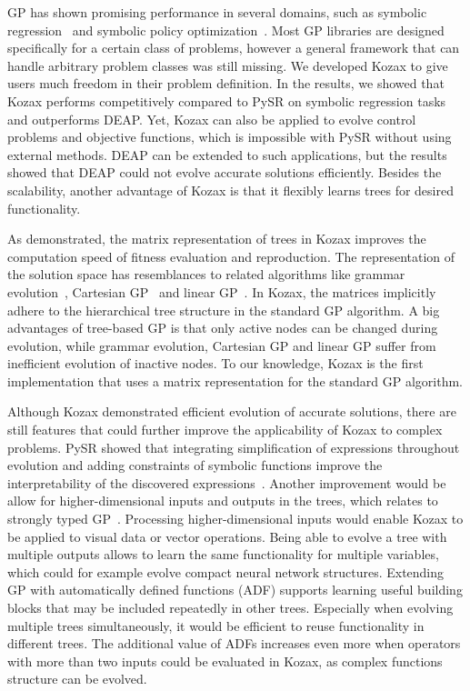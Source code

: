 \documentclass{article}
\begin{document}
GP has shown promising performance in several domains, such as symbolic regression~\cite{bongard2007automated, cranmer2023interpretable} and symbolic policy optimization~\cite{hein2018interpretable, vries2024discovering}. Most GP libraries are designed specifically for a certain class of problems, however a general framework that can handle arbitrary problem classes was still missing. We developed Kozax to give users much freedom in their problem definition. In the results, we showed that Kozax performs competitively compared to PySR on symbolic regression tasks and outperforms DEAP. Yet, Kozax can also be applied to evolve control problems and objective functions, which is impossible with PySR without using external methods. DEAP can be extended to such applications, but the results showed that DEAP could not evolve accurate solutions efficiently. Besides the scalability, another advantage of Kozax is that it flexibly learns trees for desired functionality.

As demonstrated, the matrix representation of trees in Kozax improves the computation speed of fitness evaluation and reproduction. The representation of the solution space has resemblances to related algorithms like grammar evolution~\cite{o2001grammatical}, Cartesian GP~\cite{miller2015cartesian} and linear GP~\cite{brameier2007basic}. In Kozax, the matrices implicitly adhere to the hierarchical tree structure in the standard GP algorithm. A big advantages of tree-based GP is that only active nodes can be changed during evolution, while grammar evolution, Cartesian GP and linear GP suffer from inefficient evolution of inactive nodes. To our knowledge, Kozax is the first implementation that uses a matrix representation for the standard GP algorithm.

Although Kozax demonstrated efficient evolution of accurate solutions, there are still features that could further improve the applicability of Kozax to complex problems. PySR showed that integrating simplification of expressions throughout evolution and adding constraints of symbolic functions improve the interpretability of the discovered expressions~\cite{cranmer2023interpretable}. Another improvement would be allow for higher-dimensional inputs and outputs in the trees, which relates to strongly typed GP~\cite{montana1995strongly}. Processing higher-dimensional inputs would enable Kozax to be applied to visual data or vector operations. Being able to evolve a tree with multiple outputs allows to learn the same functionality for multiple variables, which could for example evolve compact neural network structures. Extending GP with automatically defined functions (ADF) supports learning useful building blocks that may be included repeatedly in other trees. Especially when evolving multiple trees simultaneously, it would be efficient to reuse functionality in different trees. The additional value of ADFs increases even more when operators with more than two inputs could be evaluated in Kozax, as complex functions structure can be evolved.
\end{document}
